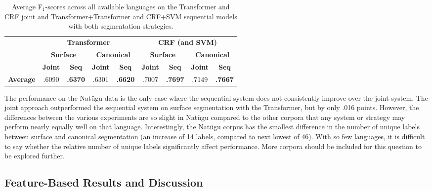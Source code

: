 \begin{table}[!tb]
    \centering
    \begin{tabular}{l|cc|cc|cc|cc}
          & \multicolumn{4}{c|}{\textbf{Transformer}} & \multicolumn{4}{c}{\textbf{CRF (and SVM)}} 
          \\
          & \multicolumn{2}{c|}{\textbf{Surface}} & \multicolumn{2}{c|}{\textbf{Canonical}}  & \multicolumn{2}{c|}{\textbf{Surface}} & \multicolumn{2}{c}{\textbf{Canonical}} 
          \\
          &  \textbf{Joint} & \textbf{Seq} &  \textbf{Joint} & \textbf{Seq} &  \textbf{Joint} & \textbf{Seq} &  \textbf{Joint} & \textbf{Seq} \\
         \hline
         \textbf{Average} & .6090 & \textbf{.6370} & .6301 & \textbf{.6620} 
                 & .7007 & \textbf{.7697} & .7149 & \textbf{.7667} \\
    \end{tabular}
    \caption[Average Results of All Joint and Sequential models]{Average F$_1$-scores across all available languages on the Transformer and CRF joint and Transformer+Transformer and CRF+SVM sequential models with both segmentation strategies.}
    \label{tab:avgsgresults}
\end{table}

The performance on the Nat\"ugu data is the only case where the sequential system does not consistently improve over the joint system. The joint approach outperformed the sequential system on surface segmentation with the Transformer, but by only .016 points. However, the differences between the various experiments are so slight in Nat\"ugu compared to the other corpora that any system or strategy may perform nearly equally well on that language. Interestingly, the Nat\"ugu corpus has the smallest difference in the number of unique labels between surface and canonical segmentation (an increase of 14 labels, compared to next lowest of 46). With so few languages, it is difficult to say whether the relative number of unique labels significantly affect performance. More corpora should be included for this question to be explored further. 
 

\subsection{Feature-Based Results and Discussion}
\label{sec:sgFtrAnalysis}

